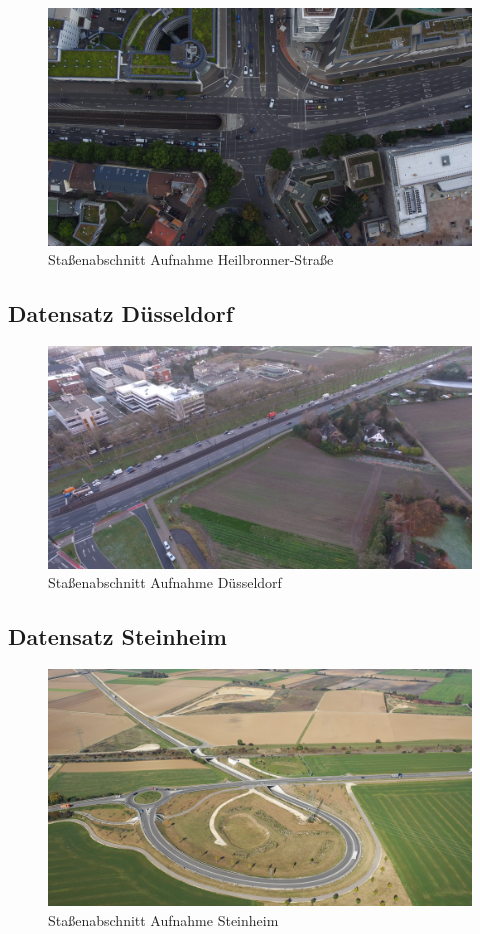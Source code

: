 \begin{figure}[H]
\centering
    \includegraphics[width=0.6\linewidth]{resources/img/Anhang/Heilbronner}
\caption{Staßenabschnitt Aufnahme Heilbronner-Straße}
\label{fig:anhang_ds_heilbronner}
\end{figure}

\subsection*{Datensatz Düsseldorf}

\begin{figure}[H]
\centering
    \includegraphics[width=0.6\linewidth]{resources/img/Anhang/Duesseldorf}
\caption{Staßenabschnitt Aufnahme Düsseldorf}
\label{fig:anhang_ds_duesseldorf}
\end{figure}

\subsection*{Datensatz Steinheim}

\begin{figure}[H]
\centering
    \includegraphics[width=0.6\linewidth]{resources/img/Anhang/Steinheim}
\caption{Staßenabschnitt Aufnahme Steinheim}
\label{fig:anhang_ds_steinheim}
\end{figure}